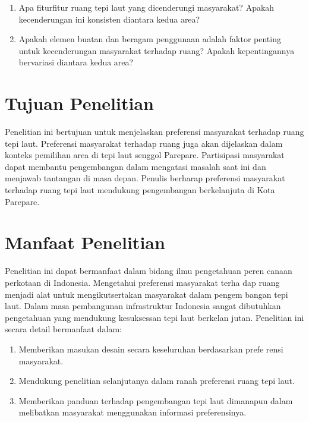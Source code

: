 \documentclass[../projects/thesis.tex]{subfiles}
\begin{document}
\begin{enumerate}
    \item Apa fitur­fitur ruang tepi laut yang dicenderungi masyarakat? Apakah kecenderungan ini konsisten diantara kedua area?
    \item Apakah elemen buatan dan beragam penggunaan adalah faktor penting untuk kecenderungan masyarakat terhadap ruang? Apakah kepentingannya bervariasi diantara kedua area?
\end{enumerate}


\section{Tujuan Penelitian}
Penelitian ini bertujuan untuk menjelaskan preferensi masyarakat terhadap ruang tepi laut. Preferensi masyarakat terhadap ruang juga akan dijelaskan dalam konteks pemilihan area di tepi laut senggol Parepare. Partisipasi masyarakat dapat membantu pengembangan dalam mengatasi masalah saat ini dan menjawab tantangan di masa depan. Penulis berharap preferensi masyarakat terhadap ruang tepi laut mendukung pengembangan berkelanjuta di Kota Parepare.


\section{Manfaat Penelitian}

Penelitian ini dapat bermanfaat dalam bidang ilmu pengetahuan peren­ canaan perkotaan di Indonesia. Mengetahui preferensi masyarakat terha­ dap ruang menjadi alat untuk mengikutsertakan masyarakat dalam pengem­ bangan tepi laut. Dalam masa pembangunan infrastruktur Indonesia sangat dibutuhkan pengetahuan yang mendukung kesuksessan tepi laut berkelan­ jutan. Penelitian ini secara detail bermanfaat dalam:

\begin{enumerate}
\item Memberikan masukan desain secara keseluruhan berdasarkan prefe­ rensi masyarakat.
\item Mendukung penelitian selanjutanya dalam ranah preferensi ruang tepi laut.
\item Memberikan panduan terhadap pengembangan tepi laut dimanapun dalam melibatkan masyarakat menggunakan informasi preferensinya.
\end{enumerate}
\end{document}

